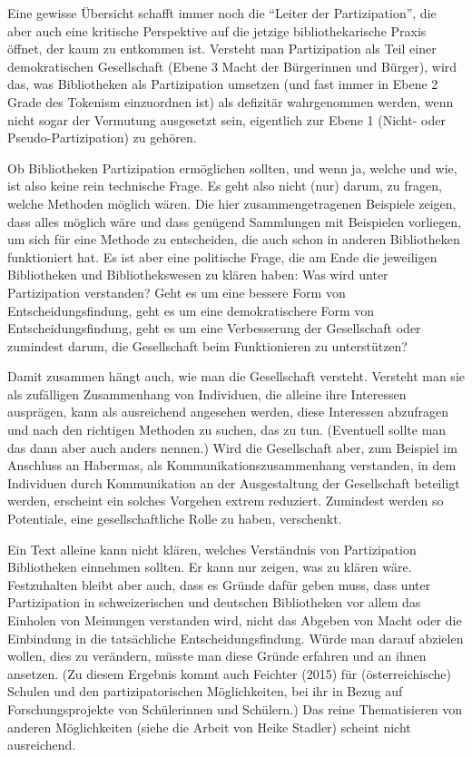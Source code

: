 \documentclass[a4paper,
fontsize=11pt,
oneside,
numbers=noperiodatend,
parskip=half-,
bibliography=totoc,
final
]{scrartcl}
\begin{document}
Eine gewisse Übersicht schafft immer noch die \enquote{Leiter der
Partizipation}, die aber auch eine kritische Perspektive auf die jetzige
bibliothekarische Praxis öffnet, der kaum zu entkommen ist. Versteht man
Partizipation als Teil einer demokratischen Gesellschaft (Ebene 3 Macht
der Bürgerinnen und Bürger), wird das, was Bibliotheken als
Partizipation umsetzen (und fast immer in Ebene 2 Grade des Tokenism
einzuordnen ist) als defizitär wahrgenommen werden, wenn nicht sogar der
Vermutung ausgesetzt sein, eigentlich zur Ebene 1 (Nicht- oder
Pseudo-Partizipation) zu gehören.

Ob Bibliotheken Partizipation ermöglichen sollten, und wenn ja, welche
und wie, ist also keine rein technische Frage. Es geht also nicht (nur)
darum, zu fragen, welche Methoden möglich wären. Die hier
zusammengetragenen Beispiele zeigen, dass alles möglich wäre und dass
genügend Sammlungen mit Beispielen vorliegen, um sich für eine Methode
zu entscheiden, die auch schon in anderen Bibliotheken funktioniert hat.
Es ist aber eine politische Frage, die am Ende die jeweiligen
Bibliotheken und Bibliothekswesen zu klären haben: Was wird unter
Partizipation verstanden? Geht es um eine bessere Form von
Entscheidungsfindung, geht es um eine demokratischere Form von
Entscheidungsfindung, geht es um eine Verbesserung der Gesellschaft oder
zumindest darum, die Gesellschaft beim Funktionieren zu unterstützen?

Damit zusammen hängt auch, wie man die Gesellschaft versteht. Versteht
man sie als zufälligen Zusammenhang von Individuen, die alleine ihre
Interessen ausprägen, kann als ausreichend angesehen werden, diese
Interessen abzufragen und nach den richtigen Methoden zu suchen, das zu
tun. (Eventuell sollte man das dann aber auch anders nennen.) Wird die
Gesellschaft aber, zum Beispiel im Anschluss an Habermas, als
Kommunikationszusammenhang verstanden, in dem Individuen durch
Kommunikation an der Ausgestaltung der Gesellschaft beteiligt werden,
erscheint ein solches Vorgehen extrem reduziert. Zumindest werden so
Potentiale, eine gesellschaftliche Rolle zu haben, verschenkt.

Ein Text alleine kann nicht klären, welches Verständnis von
Partizipation Bibliotheken einnehmen sollten. Er kann nur zeigen, was zu
klären wäre. Festzuhalten bleibt aber auch, dass es Gründe dafür geben
muss, dass unter Partizipation in schweizerischen und deutschen
Bibliotheken vor allem das Einholen von Meinungen verstanden wird, nicht
das Abgeben von Macht oder die Einbindung in die tatsächliche
Entscheidungsfindung. Würde man darauf abzielen wollen, dies zu
verändern, müsste man diese Gründe erfahren und an ihnen ansetzen. (Zu
diesem Ergebnis kommt auch Feichter (2015) für (österreichische) Schulen
und den partizipatorischen Möglichkeiten, bei ihr in Bezug auf
Forschungsprojekte von Schülerinnen und Schülern.) Das reine
Thematisieren von anderen Möglichkeiten (siehe die Arbeit von Heike
Stadler) scheint nicht ausreichend.
\end{document}
